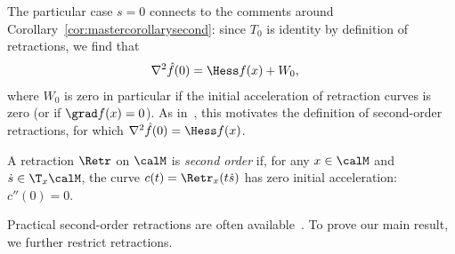 The particular case $s = 0$ connects to the comments around Corollary~\ref{cor:mastercorollarysecond}: since $T_0$ is identity by definition of retractions, we find that
\begin{align}
	\nabla^2 \hat f(0) & = \Hess f(x) + W_0,
	\label{eq:nablatwohatfHessfWzero}
\end{align}
where $W_0$ is zero in particular if the initial acceleration of retraction curves is zero (or if $\grad f(x) = 0$). As in~\citep[\S5]{AMS08}, this motivates the definition of second-order retractions, for which $\nabla^2 \hat f(0) = \Hess f(x)$.
\begin{definition}\label{def:retrsecond}
	A retraction $\Retr$ on $\calM$ is \emph{second order} if, for any $x\in\calM$ and $\dot s \in \T_x\calM$, the curve $c(t) = \Retr_x(t\dot s)$ has zero initial acceleration: $c''(0) = 0$.
\end{definition}
Practical second-order retractions are often available~\citep[Ex.~23]{absil2012retractions}.
To prove our main result, we further restrict retractions.
